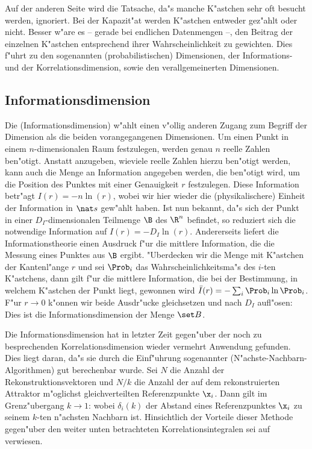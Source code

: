 Auf der anderen Seite wird die Tatsache, da"s manche K"astchen sehr oft besucht werden,
ignoriert.  Bei der Kapazit"at werden K"astchen entweder gez"ahlt oder nicht. Besser w"are 
es -- gerade bei endlichen Datenmengen --, den Beitrag der einzelnen K"astchen entsprechend
ihrer Wahrscheinlichkeit zu gewichten. Dies f"uhrt zu den sogenannten
\begriff(probabilistischen) Dimensionen, der Informations- und der Korrelationsdimension,
sowie den verallgemeinerten Dimensionen.



\subsection{Informationsdimension}
Die \begriff(Informationsdimension) w"ahlt einen v"ollig anderen Zugang zum Begriff der Dimension
als die beiden vorangegangenen Dimensionen. Um einen Punkt in einem $n$-dimensionalen Raum festzulegen,
werden genau $n$ reelle Zahlen ben"otigt. Anstatt anzugeben, wieviele reelle Zahlen
hierzu ben"otigt werden, kann auch die Menge an Information angegeben
werden, die ben"otigt wird, um die Position des Punktes mit einer Genauigkeit $r$
festzulegen. Diese Information betr"agt $I(r)=-n\ln(r)$, wobei wir hier wieder die
\naja(physikalischere) Einheit der Information in $\nat s$ gew"ahlt haben. Ist nun bekannt, da"s
sich der Punkt in einer $D_I$-dimensionalen Teilmenge $\B$ des $\R^n$ befindet, so reduziert 
sich die notwendige Information auf $I(r)=-D_I\ln(r)$. Andererseits liefert die 
Informationstheorie einen Ausdruck f"ur die mittlere Information, die die Messung eines
Punktes aus $\B$ ergibt. "Uberdecken wir die Menge mit K"astchen der Kantenl"ange $r$ und sei $\Prob_i$ 
das Wahrscheinlichkeitsma"s des $i$-ten K"astchens, dann gilt f"ur die mittlere
Information, die bei der Bestimmung, in welchem K"astchen der Punkt liegt, gewonnen wird $\bar I(r)=-\sum_i
\Prob_i\ln \Prob_i$. F"ur 
$r\to 0$ k"onnen wir beide Ausdr"ucke gleichsetzen und nach $D_I$ aufl"osen:
Dies ist die Informationsdimension der Menge $\set B$. 

Die Informationsdimension hat in letzter Zeit gegen"uber der noch zu besprechenden
Korrelationsdimension wieder vermehrt Anwendung gefunden. Dies liegt daran, da"s sie durch
die Einf"uhrung sogenannter \begriff(N"achste-Nachbarn-Algorithmen) gut berechenbar
wurde\cite{Badii85}. 
Sei $N$ die Anzahl der Rekonstruktionsvektoren und  $N/k$ die Anzahl der auf dem
rekonstruierten Attraktor m"oglichst gleichverteilten Referenzpunkte $\x_i$.
Dann gilt im Grenz"ubergang $k\to1$:
wobei $\delta_i(k)$ der Abstand eines Referenzpunktes $\x_i$ zu seinem
$k$-ten n"achsten Nachbarn ist.
Hinsichtlich der Vorteile dieser Methode gegen"uber den weiter unten betrachteten Korrelationsintegralen sei auf
\cite{Liebert91} verwiesen.



